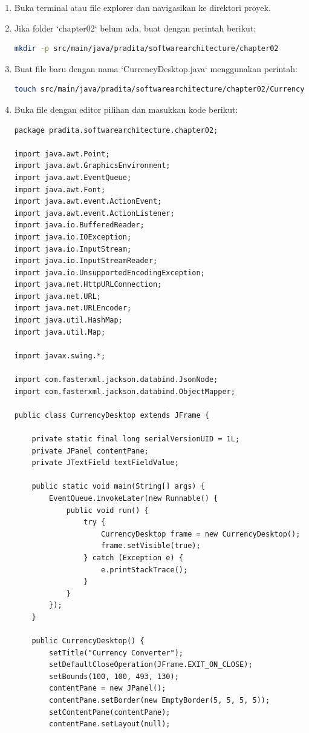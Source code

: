 \begin{enumerate}
\item Buka terminal atau file explorer dan navigasikan ke direktori proyek.
\item Jika folder `chapter02` belum ada, buat dengan perintah berikut:

\begin{lstlisting}[language=bash]
mkdir -p src/main/java/pradita/softwarearchitecture/chapter02
\end{lstlisting}

\item Buat file baru dengan nama `CurrencyDesktop.java` menggunakan perintah:

\begin{lstlisting}[language=bash]
touch src/main/java/pradita/softwarearchitecture/chapter02/CurrencyDesktop.java
\end{lstlisting}

\item Buka file dengan editor pilihan dan masukkan kode berikut:

\begin{lstlisting}[style=JavaStyle]
package pradita.softwarearchitecture.chapter02;

import java.awt.Point;
import java.awt.GraphicsEnvironment;
import java.awt.EventQueue;
import java.awt.Font;
import java.awt.event.ActionEvent;
import java.awt.event.ActionListener;
import java.io.BufferedReader;
import java.io.IOException;
import java.io.InputStream;
import java.io.InputStreamReader;
import java.io.UnsupportedEncodingException;
import java.net.HttpURLConnection;
import java.net.URL;
import java.net.URLEncoder;
import java.util.HashMap;
import java.util.Map;

import javax.swing.*;

import com.fasterxml.jackson.databind.JsonNode;
import com.fasterxml.jackson.databind.ObjectMapper;

public class CurrencyDesktop extends JFrame {
	
	private static final long serialVersionUID = 1L;
	private JPanel contentPane;
	private JTextField textFieldValue;
	
	public static void main(String[] args) {
		EventQueue.invokeLater(new Runnable() {
			public void run() {
				try {
					CurrencyDesktop frame = new CurrencyDesktop();
					frame.setVisible(true);
				} catch (Exception e) {
					e.printStackTrace();
				}
			}
		});
	}
	
	public CurrencyDesktop() {
		setTitle("Currency Converter");
		setDefaultCloseOperation(JFrame.EXIT_ON_CLOSE);
		setBounds(100, 100, 493, 130);
		contentPane = new JPanel();
		contentPane.setBorder(new EmptyBorder(5, 5, 5, 5));
		setContentPane(contentPane);
		contentPane.setLayout(null);
		

\end{lstlisting}
\end{enumerate}
